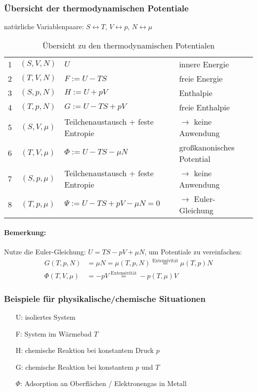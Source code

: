 \subsubsection{Übersicht der thermodynamischen Potentiale}
natürliche Variablenpaare: $S \leftrightarrow T$, $V \leftrightarrow p$, $N \leftrightarrow \mu$

\begin{table}[h]
    \centering
    \caption{Übersicht zu den thermodynamischen Potentialen}
    \begin{tabular}{lcll}
         1 & $(S,V,N)$ & $U$ & innere Energie\\
         2 & $(T,V,N)$ & $F:= U - TS$ & freie Energie \\
         3 & $(S,p,N)$ & $H:= U + pV$ & Enthalpie \\
         4 & $(T,p,N)$ & $G := U - TS +pV$ & freie Enthalpie \\
         5 & $(S,V,\mu)$ & Teilchenaustausch + feste Entropie & $\rightarrow$ keine Anwendung\\
         6 & $(T,V,\mu)$ & $\Phi := U - TS - \mu N$ & großkanonisches Potential\\
         7 & $(S,p,\mu)$ & Teilchenaustausch + feste Entropie & $\rightarrow$ keine Anwendung\\
         8 & $(T,p,\mu)$ & $\Psi := U - TS + pV - \mu N = 0$ & $\rightarrow$ Euler-Gleichung\\
    \end{tabular}
    \label{tab:thermodynamische Potentiale}
\end{table}

\paragraph{Bemerkung:}
Nutze die Euler-Gleichung: $U = TS-pV+\mu N$, um Potentiale zu vereinfachen:
\begin{align}
    G(T,p,N) &= \mu N = \mu(T,p,N) \stackrel{\text{Extensivität}}{=} \mu(T,p) N \\
    \Phi(T,V,\mu) &= - pV \stackrel{\text{Extensivität}}{=} - p(T,\mu) V
\end{align}

\subsubsection{Beispiele für physikalische/chemische Situationen}
\begin{itemize}
    \item[U:] isoliertes System
    \item[F:] System im Wärmebad $T$
    \item[H:] chemische Reaktion bei konstantem Druck $p$
    \item[G:] chemische Reaktion bei konstantem $p$ und $T$
    \item[$\Phi$:] Adsorption an Oberflächen / Elektronengas in Metall 
\end{itemize}

